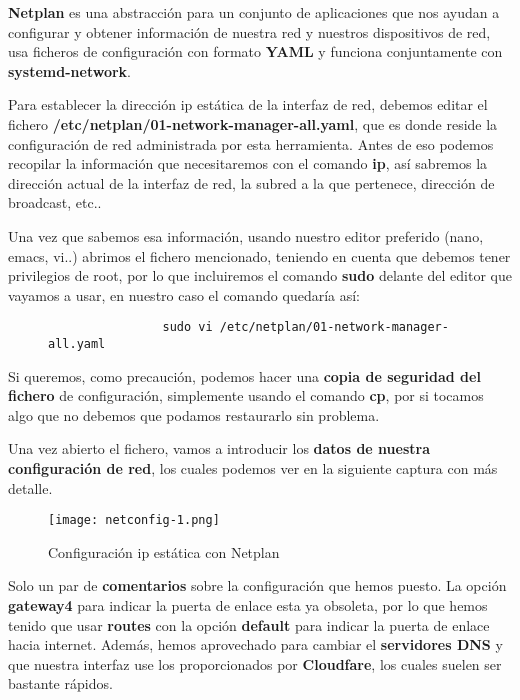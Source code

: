\textbf{Netplan} es una abstracción para un conjunto de aplicaciones que nos ayudan a configurar y obtener información de nuestra red y nuestros dispositivos de red, usa ficheros de configuración con formato \textbf{YAML} y funciona conjuntamente con \textbf{systemd-network}.

Para establecer la dirección ip estática de la interfaz de red, debemos editar el fichero \textbf{/etc/netplan/01-network-manager-all.yaml}, que es donde reside la configuración de red administrada por esta herramienta. Antes de eso podemos recopilar la información que necesitaremos con el comando \textbf{ip}, así sabremos la dirección actual de la interfaz de red, la subred a la que pertenece, dirección de broadcast, etc..

Una vez que sabemos esa información, usando nuestro editor preferido (nano, emacs, vi..) abrimos el fichero mencionado, teniendo en cuenta que debemos tener privilegios de root, por lo que incluiremos el comando \textbf{sudo} delante del editor que vayamos a usar, en nuestro caso el comando quedaría así:

\begin{figure}[H]
    \begin{tcolorbox}[sharp corners, colback=yellow!30, colframe=white!20]
        \scriptsize
        \begin{verbatim}
                sudo vi /etc/netplan/01-network-manager-all.yaml\end{verbatim}
    \end{tcolorbox}
\end{figure}


Si queremos, como precaución, podemos hacer una \textbf{copia de seguridad del fichero} de configuración, simplemente usando el comando \textbf{cp}, por si tocamos algo que no debemos que podamos restaurarlo sin problema.

Una vez abierto el fichero, vamos a introducir los\textbf{ datos de nuestra configuración de red}, los cuales podemos ver en la siguiente captura con más detalle.

\begin{figure}[H]
    \centering
    \texttt{[image: netconfig-1.png]}
    \caption{Configuración ip estática con Netplan}
\end{figure}

Solo un par de \textbf{comentarios} sobre la configuración que hemos puesto. La opción \textbf{gateway4} para indicar la puerta de enlace esta ya obsoleta, por lo que hemos tenido que usar \textbf{routes} con la opción \textbf{default} para indicar la puerta de enlace hacia internet. Además, hemos aprovechado para cambiar el \textbf{servidores DNS} y que nuestra interfaz use los proporcionados por \textbf{Cloudfare}, los cuales suelen ser bastante rápidos.

